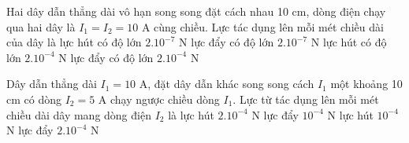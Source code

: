 \begin{vidu} %
	Hai dây dẫn thẳng dài vô hạn song song đặt cách nhau 10 cm, dòng điện chạy qua hai dây là $I_1 = I_2 = 10$ A cùng chiều. Lực tác dụng lên mỗi mét chiều dài của dây là
	\choice
	{lực hút có độ lớn $2. 10^{-7}$ N}
	{lực đẩy có độ lớn $2. 10^{-7}$ N}
	{\True lực hút có độ lớn $2. 10^{-4}$ N}
	{lực đẩy có độ lớn $2. 10^{-4}$ N}
\end{vidu}
\begin{vidu} %
	Dây dẫn thẳng dài $I_1 = 10$ A, đặt dây dẫn khác song song cách $I_1$ một khoảng 10 cm có dòng $I_2 = 5$ A chạy ngược chiều dòng $I_1$. Lực từ tác dụng lên mỗi mét chiều dài dây mang dòng điện $I_2$ là
	\choice
	{lực hút $2. 10^{-4}$ N}
	{\True lực đẩy $10^{-4}$ N}
	{lực hút $10^{-4}$ N}
	{lực đẩy $2.10^{-4}$ N}
\end{vidu}
